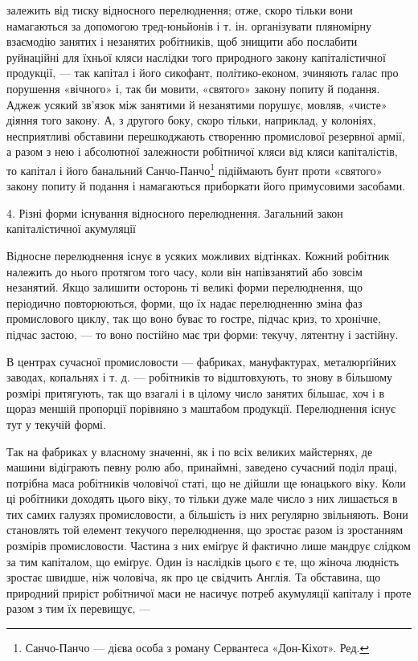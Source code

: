 залежить від тиску відносного перелюднення; отже, скоро тільки вони намагаються за допомогою
тред-юньйонів і т. ін. організувати пляномірну взаємодію занятих і незанятих робітників, щоб знищити
або послабити руйнаційні для їхньої кляси наслідки того природного закону капіталістичної продукції,
— так капітал і його сикофант, політико-економ, зчиняють галас про порушення «вічного» і, так би
мовити, «святого» закону попиту й подання. Аджеж усякий зв’язок між занятими й незанятими
порушує, мовляв, «чисте» діяння того закону. А, з другого боку, скоро тільки, наприклад, у колоніях,
несприятливі обставини перешкоджають створенню промислової резервної армії, а разом з нею і
абсолютної залежности робітничої кляси від кляси капіталістів, то капітал і його банальний
Санчо-Панчо\footnote*{
Санчо-Панчо — дієва особа з роману Сервантеса «Дон-Кіхот». Ред.
} підіймають
бунт проти «святого» закону попиту й подання і намагаються приборкати його примусовими засобами.

4. Різні форми існування відносного перелюднення. Загальний закон капіталістичної акумуляції

Відносне перелюднення існує в усяких можливих відтінках. Кожний робітник належить до нього протягом
того часу, коли він напівзанятий або зовсім незанятий. Якщо залишити осторонь ті великі форми
перелюднення, що періодично повторюються,
форми, що їх надає перелюдненню зміна фаз промислового циклу, так що воно буває то гостре, підчас
криз, то хронічне, підчас застою, — то воно постійно має три форми: текучу, лятентну і застійну.

В центрах сучасної промисловости — фабриках, мануфактурах, металюрґійних заводах, копальнях і т. д.
— робітників то відштовхують, то знову в більшому розмірі притягують, так що взагалі і в цілому
число занятих більшає, хоч і в щораз
меншій пропорції порівняно з маштабом продукції. Перелюднення існує тут у текучій формі.

Так на фабриках у власному значенні, як і по всіх великих майстернях, де машини відіграють певну
ролю або, принаймні, заведено сучасний поділ праці, потрібна маса робітників чоловічої статі, що не
дійшли ще юнацького віку. Коли ці робітники доходять цього віку, то тільки дуже мале число з них
лишається в тих самих галузях промисловости, а більшість із них реґулярно звільняють. Вони
становлять той елемент текучого перелюднення, що зростає разом із зростанням розмірів промисловости.
Частина з них еміґрує й фактично лише мандрує слідком за тим капіталом, що еміґрує. Один із
наслідків цього є те, що жіноча людність зростає швидше, ніж чоловіча, як про це свідчить Англія. Та
обставина, що природний приріст робітничої маси не насичує
потреб акумуляції капіталу і проте разом з тим їх перевищує, —